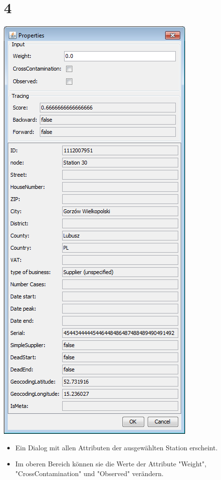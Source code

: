 \documentclass{beamer}
\begin{document}
\section{4}
\begin{frame}
	\begin{center}
  		\includegraphics[height=0.6\textheight]{4.png}
	\end{center}
	\begin{itemize}
		\item Ein Dialog mit allen Attributen der ausgewählten Station erscheint.
		\item Im oberen Bereich können sie die Werte der Attribute "Weight", "CrossContamination" und "Observed" verändern.		
	\end{itemize}
\end{frame}
\end{document}
